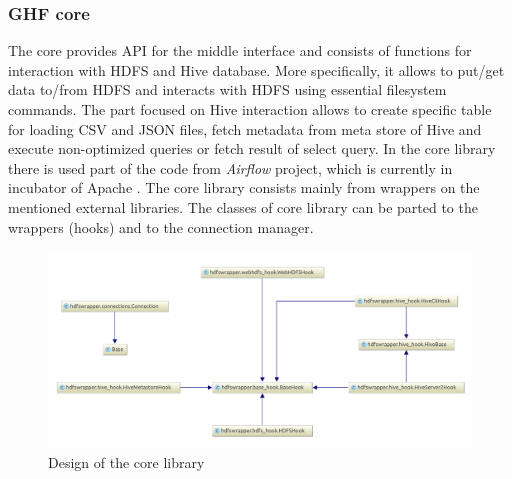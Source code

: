 \documentclass[a4paper,12pt,oneside]{report}
\begin{document}
	\subsubsection{GHF core}
	The core provides API for the middle interface and  consists of functions for
	interaction with HDFS and Hive database. More specifically, it allows to put/get
	data to/from HDFS and interacts with HDFS using essential filesystem commands.
	The part focused on Hive interaction allows to create specific table for
	loading CSV and JSON files, fetch metadata from meta store of Hive and execute
	non-optimized queries or fetch result of select query. In the core library there is
	used part of the code from \textit{Airflow} project, which is currently in
	incubator of Apache \cite{airflow_diff}. 
	The core library consists mainly from wrappers on
	the mentioned external libraries. The classes of core library can be parted to
	the  wrappers (hooks) and to the connection manager. 
	
	\begin{figure}[!htbp]
		\centering
		\includegraphics[width=1\textwidth]{./img/diag1_small.pdf}
		\caption[Core GHF diagram]{\centering Design of the core library }
	\end{figure} 
	
\end{document}
